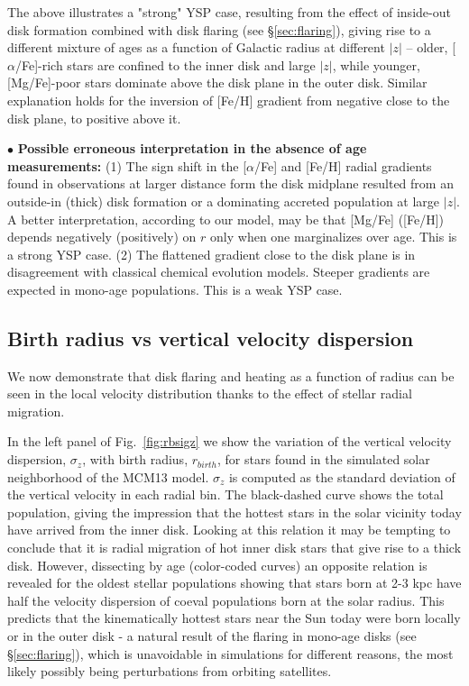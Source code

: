 \documentclass[usenatbib]{mnras}
\begin{document}
The above illustrates a "strong" YSP case, resulting from the effect of inside-out disk formation combined with disk flaring (see \S\ref{sec:flaring}), giving rise to a different mixture of ages as a function of Galactic radius at different $|z|$ -- older, [$\alpha$/Fe]-rich stars are confined to the inner disk and large $|z|$, while younger, [Mg/Fe]-poor stars dominate above the disk plane in the outer disk. Similar explanation holds for the inversion of [Fe/H] gradient from negative close to the disk plane, to positive above it.

$\bullet$ {\bf Possible erroneous interpretation in the absence of age measurements:} 
(1) The sign shift in the [$\alpha$/Fe] and [Fe/H] radial gradients found in observations at larger distance form the disk midplane resulted from an outside-in (thick) disk formation or a dominating accreted population at large $|z|$. A better interpretation, according to our model, may be that [Mg/Fe] ([Fe/H]) depends negatively (positively) on $r$ only when one marginalizes over age. This is a strong YSP case. (2) The flattened gradient close to the disk plane is in disagreement with classical chemical evolution models. Steeper gradients are expected in mono-age populations. This is a weak YSP case.


\subsection{Birth radius vs vertical velocity dispersion}
\label{sec:rb}

We now demonstrate that disk flaring and heating as a function of radius can be seen in the local velocity distribution thanks to the effect of stellar radial migration.

In the left panel of Fig.~\ref{fig:rbsigz} we show the variation of the vertical velocity dispersion, $\sigma_z$, with birth radius, $r_{birth}$, for stars found in the simulated solar neighborhood of the MCM13 model. $\sigma_z$ is computed as the standard deviation of the vertical velocity in each radial bin. The black-dashed curve shows the total population, giving the impression that the hottest stars in the solar vicinity today have arrived from the inner disk. Looking at this relation it may be tempting to conclude that it is radial migration of hot inner disk stars that give rise to a thick disk. However, dissecting by age (color-coded curves) an opposite relation is revealed for the oldest stellar populations showing that stars born at 2-3 kpc have half the velocity dispersion of coeval populations born at the solar radius. This predicts that the kinematically hottest stars near the Sun today were born locally or in the outer disk - a natural result of the flaring in mono-age disks (see \S\ref{sec:flaring}), which is unavoidable in simulations for different reasons, the most likely possibly being perturbations from orbiting satellites.
\end{document}
